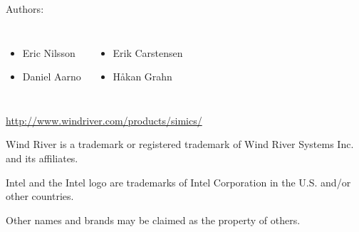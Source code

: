 \begin{frame}
  Authors:

  \begin{columns}
    \begin{itemize}
    \item Eric Nilsson
    \item Daniel Aarno
    \end{itemize}
    \begin{itemize}
    \item Erik Carstensen
    \item H{\aa}kan Grahn
    \end{itemize}
  \end{columns}

  \vspace{1cm}

  \begin{center}
    \url{http://www.windriver.com/products/simics/}
  \end{center}

  \vspace{1cm}

  \begin{center}\tiny
    Wind River is a trademark or registered trademark of Wind River Systems Inc. and its affiliates.

    Intel and the Intel logo are trademarks of Intel Corporation in the U.S. and/or other countries.

    Other names and brands may be claimed as the property of others.
  \end{center}

\end{frame}
